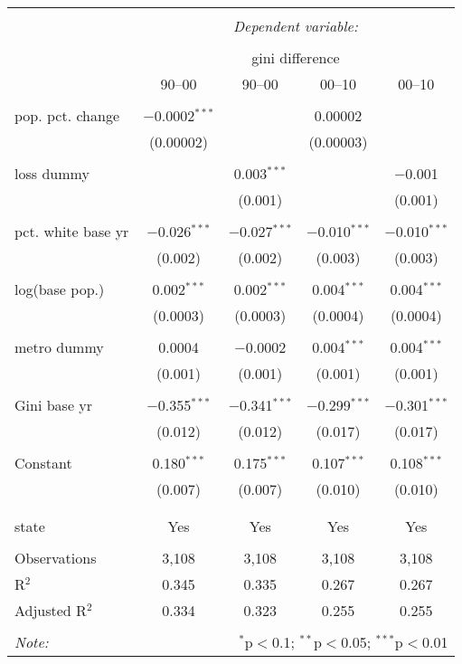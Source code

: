 \documentclass{standalone}
\begin{document}
\begin{tabular}{@{\extracolsep{5pt}}lcccc} 
\\[-1.8ex]\hline 
\hline \\[-1.8ex] 
 & \multicolumn{4}{c}{\textit{Dependent variable:}} \\ 
\cline{2-5} 
\\[-1.8ex] & \multicolumn{4}{c}{gini difference} \\ 
 & 90--00 & 90--00 & 00--10 & 00--10 \\ 
\hline \\[-1.8ex] 
 pop. pct. change & $-$0.0002$^{***}$ &  & 0.00002 &  \\ 
  & (0.00002) &  & (0.00003) &  \\ 
  & & & & \\ 
 loss dummy &  & 0.003$^{***}$ &  & $-$0.001 \\ 
  &  & (0.001) &  & (0.001) \\ 
  & & & & \\ 
 pct. white base yr & $-$0.026$^{***}$ & $-$0.027$^{***}$ & $-$0.010$^{***}$ & $-$0.010$^{***}$ \\ 
  & (0.002) & (0.002) & (0.003) & (0.003) \\ 
  & & & & \\ 
 log(base pop.) & 0.002$^{***}$ & 0.002$^{***}$ & 0.004$^{***}$ & 0.004$^{***}$ \\ 
  & (0.0003) & (0.0003) & (0.0004) & (0.0004) \\ 
  & & & & \\ 
 metro dummy & 0.0004 & $-$0.0002 & 0.004$^{***}$ & 0.004$^{***}$ \\ 
  & (0.001) & (0.001) & (0.001) & (0.001) \\ 
  & & & & \\ 
 Gini base yr & $-$0.355$^{***}$ & $-$0.341$^{***}$ & $-$0.299$^{***}$ & $-$0.301$^{***}$ \\ 
  & (0.012) & (0.012) & (0.017) & (0.017) \\ 
  & & & & \\ 
 Constant & 0.180$^{***}$ & 0.175$^{***}$ & 0.107$^{***}$ & 0.108$^{***}$ \\ 
  & (0.007) & (0.007) & (0.010) & (0.010) \\ 
  & & & & \\ 
\hline \\[-1.8ex] 
state & Yes & Yes & Yes & Yes \\ 
\hline \\[-1.8ex] 
Observations & 3,108 & 3,108 & 3,108 & 3,108 \\ 
R$^{2}$ & 0.345 & 0.335 & 0.267 & 0.267 \\ 
Adjusted R$^{2}$ & 0.334 & 0.323 & 0.255 & 0.255 \\ 
\hline 
\hline \\[-1.8ex] 
\textit{Note:}  & \multicolumn{4}{r}{$^{*}$p$<$0.1; $^{**}$p$<$0.05; $^{***}$p$<$0.01} \\ 
\end{tabular} 
\end{document}
